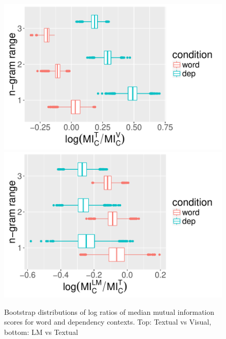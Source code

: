 \begin{figure}
  \centering
  \includegraphics[scale=0.5]{bootstrappedMI.pdf}
  \includegraphics[scale=0.5]{bootstrappedMI2.pdf}
  \caption{Bootstrap distributions of log ratios of median mutual
    information scores for word and dependency contexts. Top: {\sc Textual}
      vs {\sc Visual}, bottom: {\sc LM} vs {\sc Textual}}
  \label{fig:mi-boot}
  \vspace{-.2cm}
\end{figure}






